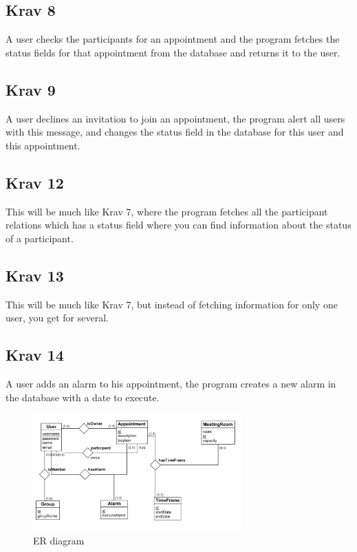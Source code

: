 \documentclass[a4paper, 10pt]{article}
\begin{document}
\subsection*{Krav 8}
A user checks the participants for an appointment and the program fetches the status fields for that appointment from the database and returns it to the user.

\subsection*{Krav 9}
A user declines an invitation to join an appointment, the program alert all users with this message, and changes the status field in the database for this user and this appointment.

\subsection*{Krav 12}
This will be much like Krav 7, where the program fetches all the participant relations which has a status field where you can find information about the status of a participant.

\subsection*{Krav 13}
This will be much like Krav 7, but instead of fetching information for only one user, you get for several.

\subsection*{Krav 14}
A user adds an alarm to his appointment, the program creates a new alarm in the database with a date to execute.

\begin{figure}[h!] 
    \begin{center}  
        \includegraphics[width=8cm]{erdiagram.png}
        \caption{ER diagram}
    \label{class}
    \end{center}
\end{figure}
\end{document}
